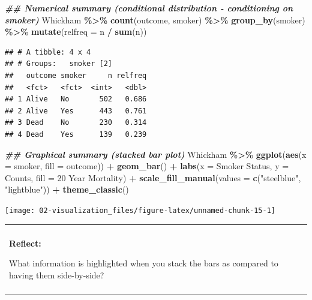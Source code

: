 \documentclass[
]{book}
\newenvironment{Shaded}{\begin{snugshade}}{\end{snugshade}}
\newcommand{\AttributeTok}[1]{\textcolor[rgb]{0.13,0.29,0.53}{#1}}
\newcommand{\DocumentationTok}[1]{\textcolor[rgb]{0.56,0.35,0.01}{\textbf{\textit{#1}}}}
\newcommand{\FunctionTok}[1]{\textcolor[rgb]{0.13,0.29,0.53}{\textbf{#1}}}
\newcommand{\NormalTok}[1]{#1}
\newcommand{\SpecialCharTok}[1]{\textcolor[rgb]{0.81,0.36,0.00}{\textbf{#1}}}
\newcommand{\StringTok}[1]{\textcolor[rgb]{0.31,0.60,0.02}{#1}}
\newenvironment{reflect}
{
    \begin{center}
    
    \begin{tabular}{|p{0.8\textwidth}|}
    \rowcolor{LightBlue}
    \hline\\
    \rowcolor{LightBlue}
    \textbf{Reflect:}
}
{
    \\\rowcolor{LightBlue}
    \\\hline
    \end{tabular} 
    \end{center}
}
\begin{document}
\begin{Shaded}
\begin{Highlighting}[]
\DocumentationTok{\#\# Numerical summary (conditional distribution {-} conditioning on smoker)}
\NormalTok{Whickham }\SpecialCharTok{\%\textgreater{}\%}
    \FunctionTok{count}\NormalTok{(outcome, smoker) }\SpecialCharTok{\%\textgreater{}\%}
    \FunctionTok{group\_by}\NormalTok{(smoker) }\SpecialCharTok{\%\textgreater{}\%}
    \FunctionTok{mutate}\NormalTok{(}\AttributeTok{relfreq =}\NormalTok{ n }\SpecialCharTok{/} \FunctionTok{sum}\NormalTok{(n)) }
\end{Highlighting}
\end{Shaded}

\begin{verbatim}
## # A tibble: 4 x 4
## # Groups:   smoker [2]
##   outcome smoker     n relfreq
##   <fct>   <fct>  <int>   <dbl>
## 1 Alive   No       502   0.686
## 2 Alive   Yes      443   0.761
## 3 Dead    No       230   0.314
## 4 Dead    Yes      139   0.239
\end{verbatim}

\begin{Shaded}
\begin{Highlighting}[]
\DocumentationTok{\#\# Graphical summary (stacked bar plot)}
\NormalTok{Whickham }\SpecialCharTok{\%\textgreater{}\%}
    \FunctionTok{ggplot}\NormalTok{(}\FunctionTok{aes}\NormalTok{(}\AttributeTok{x =}\NormalTok{ smoker, }\AttributeTok{fill =}\NormalTok{ outcome)) }\SpecialCharTok{+} 
    \FunctionTok{geom\_bar}\NormalTok{() }\SpecialCharTok{+} 
    \FunctionTok{labs}\NormalTok{(}\AttributeTok{x =} \StringTok{\textquotesingle{}Smoker Status\textquotesingle{}}\NormalTok{, }\AttributeTok{y =} \StringTok{\textquotesingle{}Counts\textquotesingle{}}\NormalTok{, }\AttributeTok{fill =} \StringTok{\textquotesingle{}20 Year Mortality\textquotesingle{}}\NormalTok{) }\SpecialCharTok{+} 
    \FunctionTok{scale\_fill\_manual}\NormalTok{(}\AttributeTok{values =} \FunctionTok{c}\NormalTok{(}\StringTok{"steelblue"}\NormalTok{, }\StringTok{"lightblue"}\NormalTok{)) }\SpecialCharTok{+} 
    \FunctionTok{theme\_classic}\NormalTok{()}
\end{Highlighting}
\end{Shaded}

\begin{center}\texttt{[image: 02-visualization\_files/figure-latex/unnamed-chunk-15-1]} \end{center}

\begin{reflect}
What information is highlighted when you stack the bars as compared to
having them side-by-side?
\end{reflect}
\end{document}

